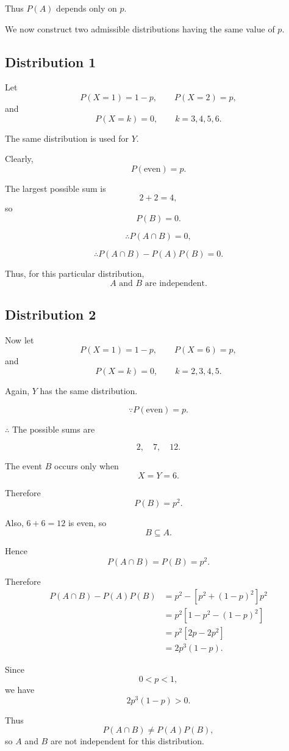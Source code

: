 \documentclass[12pt]{article}
\begin{document}
Thus \(P(A)\) depends only on \(p\).

We now construct two admissible distributions having the same value of \(p\).

\subsection*{Distribution 1}

Let
\[
P(X=1)=1-p,\qquad P(X=2)=p,
\]
and
\[
P(X=k)=0,\qquad k=3,4,5,6.
\]

The same distribution is used for \(Y\).

Clearly,
\[
P(\text{even})=p.
\]

The largest possible sum is
\[
2+2=4,
\]
so
\[
P(B)=0.
\]

\[
\therefore
P(A\cap B)=0,
\]

\[
\therefore
P(A\cap B)-P(A)P(B)
=
0.
\]

Thus, for this particular distribution,
\[
A\text{ and }B\text{ are independent}.
\]

\subsection*{Distribution 2}

Now let
\[
P(X=1)=1-p,\qquad P(X=6)=p,
\]
and
\[
P(X=k)=0,\qquad k=2,3,4,5.
\]

Again, \(Y\) has the same distribution.

\[
\because
P(\text{even})=p.
\]

$\therefore  $  The possible sums are

\[
2,\quad 7,\quad 12.
\]

The event \(B\) occurs only when
\[
X=Y=6.
\]

Therefore
\[
P(B)=p^2.
\]

Also, \(6+6=12\) is even, so
\[
B\subseteq A.
\]

Hence
\[
P(A\cap B)=P(B)=p^2.
\]

Therefore
\begin{align*}
P(A\cap B)-P(A)P(B)
&=
p^2-\left[p^2+(1-p)^2\right]p^2\\
&=
p^2\left[1-p^2-(1-p)^2\right]\\
&=
p^2\left[2p-2p^2\right]\\
&=
2p^3(1-p).
\end{align*}

Since
\[
0<p<1,
\]
we have
\[
2p^3(1-p)>0.
\]

Thus
\[
P(A\cap B)\neq P(A)P(B),
\]
so \(A\) and \(B\) are not independent for this distribution.
\end{document}
